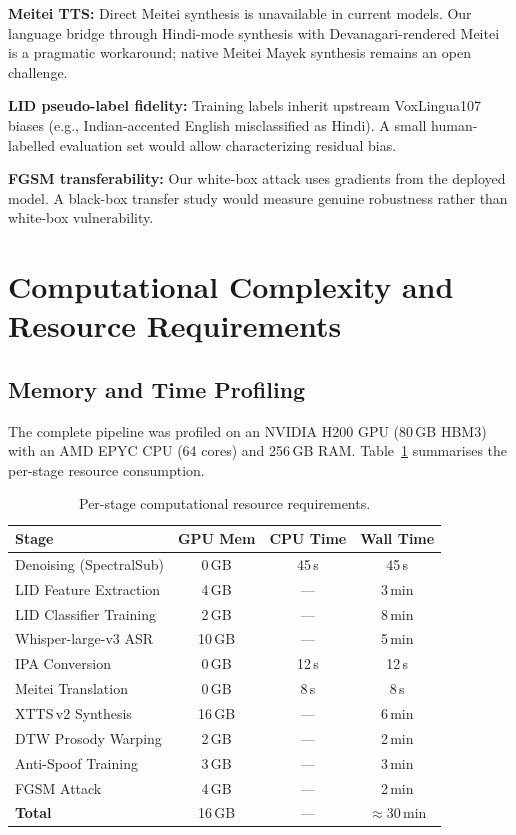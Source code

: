 \documentclass[11pt]{article}
\begin{document}
\textbf{Meitei TTS:} Direct Meitei synthesis is unavailable in current
models. Our language bridge through Hindi-mode synthesis with
Devanagari-rendered Meitei is a pragmatic workaround; native Meitei Mayek
synthesis remains an open challenge.

\textbf{LID pseudo-label fidelity:} Training labels inherit upstream
VoxLingua107 biases (e.g., Indian-accented English misclassified as Hindi).
A small human-labelled evaluation set would allow characterizing residual
bias.

\textbf{FGSM transferability:} Our white-box attack uses gradients from the
deployed model. A black-box transfer study would measure genuine robustness
rather than white-box vulnerability.


\section{Computational Complexity and Resource Requirements}

\subsection{Memory and Time Profiling}

The complete pipeline was profiled on an NVIDIA H200 GPU (80\,GB HBM3) with
an AMD EPYC CPU (64 cores) and 256\,GB RAM. Table~\ref{tab:compute} summarises
the per-stage resource consumption.

\begin{table}[ht]
\centering
\caption{Per-stage computational resource requirements.}
\label{tab:compute}
\begin{tabular}{lccc}
\toprule
\textbf{Stage} & \textbf{GPU Mem} & \textbf{CPU Time} & \textbf{Wall Time}\\
\midrule
Denoising (SpectralSub) & 0\,GB & 45\,s & 45\,s\\
LID Feature Extraction  & 4\,GB & ---   & 3\,min\\
LID Classifier Training & 2\,GB & ---   & 8\,min\\
Whisper-large-v3 ASR    & 10\,GB & ---  & 5\,min\\
IPA Conversion          & 0\,GB & 12\,s & 12\,s\\
Meitei Translation      & 0\,GB & 8\,s  & 8\,s\\
XTTS\,v2 Synthesis      & 16\,GB & ---  & 6\,min\\
DTW Prosody Warping     & 2\,GB & ---   & 2\,min\\
Anti-Spoof Training     & 3\,GB & ---   & 3\,min\\
FGSM Attack             & 4\,GB & ---   & 2\,min\\
\midrule
\textbf{Total}          & 16\,GB & ---  & $\approx$30\,min\\
\bottomrule
\end{tabular}
\end{table}
\end{document}
